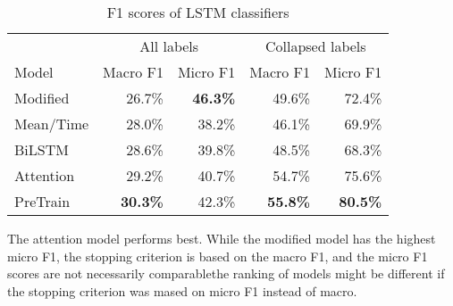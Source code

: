 \begin{table}
  \centering
  \begin{tabular}{|l|rr|rr|}
    \toprule
            & \multicolumn{2}{c|}{All labels} & \multicolumn{2}{c|}{Collapsed labels} \\
    Model     & Macro F1        & Micro F1        & Macro F1        & Micro F1        \\
    \midrule
    Modified  &         26.7\%  & \textbf{46.3\%} &         49.6\%  &         72.4\%  \\
    Mean/Time &         28.0\%  &         38.2\%  &         46.1\%  &         69.9\%  \\
    BiLSTM    &         28.6\%  &         39.8\%  &         48.5\%  &         68.3\%  \\
    Attention &         29.2\%  &         40.7\%  &         54.7\%  &         75.6\%  \\
    PreTrain  & \textbf{30.3\%} &         42.3\%  & \textbf{55.8\%} & \textbf{80.5\%} \\
    \bottomrule
  \end{tabular}
  \caption{F1 scores of LSTM classifiers}
  \label{lstm-results}
\end{table}

The attention model performs best. While the modified model has the highest
micro F1, the stopping criterion is based on the macro F1, and the micro
F1 scores are not necessarily comparable\textemdash the ranking of models might be
different if the stopping criterion was mased on micro F1 instead of macro.
